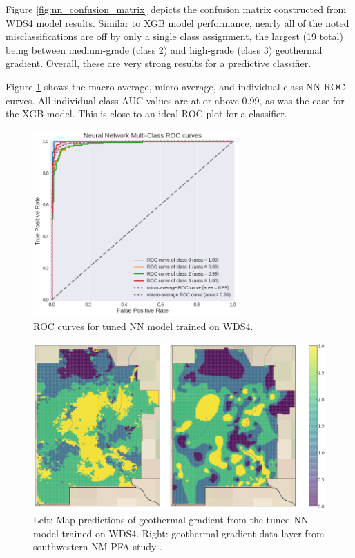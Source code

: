 Figure \ref{fig:nn_confusion_matrix} depicts the confusion matrix constructed from WDS4 model results. Similar to XGB model performance, nearly all of the noted misclassifications are off by only a single class assignment, the largest (19 total) being between medium-grade (class 2) and high-grade (class 3) geothermal gradient. Overall, these are very strong results for a predictive classifier.

Figure \ref{fig:nn_auc} shows the macro average, micro average, and individual class NN ROC curves. All individual class AUC values are at or above 0.99, as was the case for the XGB model. This is close to an ideal ROC plot for a classifier.

\begin{figure}[htp]
\centering
\includegraphics[width=0.7\textwidth]{templates/images/Figure-NN-AUC.png}
\caption[Neural network ROC curves]{ROC curves for tuned NN model trained on WDS4.}
\label{fig:nn_auc}
\end{figure}

\begin{figure}[!htp]
\centering
\includegraphics[width=\textwidth]{templates/images/Figure-NN-FinalMap_Joint.png}
\caption[Neural network final map]{Left: Map predictions of geothermal gradient from the tuned NN model trained on WDS4. Right: geothermal gradient data layer from southwestern NM PFA study \protect\citep{bielicki_hydrogeolgic_2015}.}
\label{fig:nn_final_map}
\end{figure}

